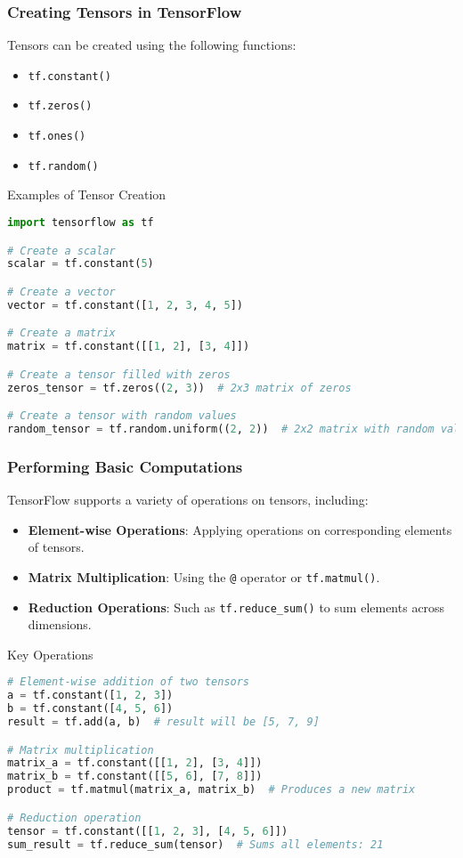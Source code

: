 \documentclass[aspectratio=169]{beamer}
\begin{document}
\begin{frame}[fragile]
    \frametitle{Creating Tensors in TensorFlow}
    Tensors can be created using the following functions:
    \begin{itemize}
        \item \texttt{tf.constant()}
        \item \texttt{tf.zeros()}
        \item \texttt{tf.ones()}
        \item \texttt{tf.random()}
    \end{itemize}

    \begin{block}{Examples of Tensor Creation}
    \begin{lstlisting}[language=Python]
import tensorflow as tf

# Create a scalar
scalar = tf.constant(5)

# Create a vector
vector = tf.constant([1, 2, 3, 4, 5])

# Create a matrix
matrix = tf.constant([[1, 2], [3, 4]])

# Create a tensor filled with zeros
zeros_tensor = tf.zeros((2, 3))  # 2x3 matrix of zeros

# Create a tensor with random values
random_tensor = tf.random.uniform((2, 2))  # 2x2 matrix with random values
    \end{lstlisting}
    \end{block}
\end{frame}

\begin{frame}[fragile]
    \frametitle{Performing Basic Computations}
    TensorFlow supports a variety of operations on tensors, including:
    \begin{itemize}
        \item \textbf{Element-wise Operations}: Applying operations on corresponding elements of tensors.
        \item \textbf{Matrix Multiplication}: Using the \texttt{@} operator or \texttt{tf.matmul()}.
        \item \textbf{Reduction Operations}: Such as \texttt{tf.reduce\_sum()} to sum elements across dimensions.
    \end{itemize}

    \begin{block}{Key Operations}
    \begin{lstlisting}[language=Python]
# Element-wise addition of two tensors
a = tf.constant([1, 2, 3])
b = tf.constant([4, 5, 6])
result = tf.add(a, b)  # result will be [5, 7, 9]

# Matrix multiplication
matrix_a = tf.constant([[1, 2], [3, 4]])
matrix_b = tf.constant([[5, 6], [7, 8]])
product = tf.matmul(matrix_a, matrix_b)  # Produces a new matrix

# Reduction operation
tensor = tf.constant([[1, 2, 3], [4, 5, 6]])
sum_result = tf.reduce_sum(tensor)  # Sums all elements: 21
    \end{lstlisting}
    \end{block}
\end{frame}
\end{document}
